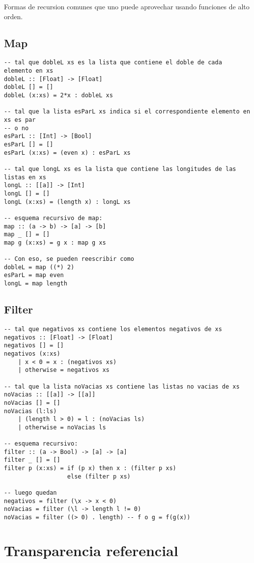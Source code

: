 \documentclass{report}
\theoremstyle{definition} %
\begin{document}
Formas de recursion comunes que uno puede aprovechar usando funciones de alto
orden.

\subsection{Map}

\begin{verbatim}
-- tal que dobleL xs es la lista que contiene el doble de cada elemento en xs
dobleL :: [Float] -> [Float]
dobleL [] = []
dobleL (x:xs) = 2*x : dobleL xs

-- tal que la lista esParL xs indica si el correspondiente elemento en xs es par
-- o no
esParL :: [Int] -> [Bool] 
esParL [] = []
esParL (x:xs) = (even x) : esParL xs

-- tal que longL xs es la lista que contiene las longitudes de las listas en xs
longL :: [[a]] -> [Int]
longL [] = []
longL (x:xs) = (length x) : longL xs

-- esquema recursivo de map:
map :: (a -> b) -> [a] -> [b]
map _ [] = []
map g (x:xs) = g x : map g xs

-- Con eso, se pueden reescribir como
dobleL = map ((*) 2)
esParL = map even
longL = map length
\end{verbatim}

\subsection{Filter}

\begin{verbatim}
-- tal que negativos xs contiene los elementos negativos de xs
negativos :: [Float] -> [Float]
negativos [] = []
negativos (x:xs)
    | x < 0 = x : (negativos xs)
    | otherwise = negativos xs

-- tal que la lista noVacias xs contiene las listas no vacias de xs
noVacias :: [[a]] -> [[a]]
noVacias [] = []
noVacias (l:ls)
    | (length l > 0) = l : (noVacias ls)
    | otherwise = noVacias ls

-- esquema recursivo:
filter :: (a -> Bool) -> [a] -> [a]
filter _ [] = []
filter p (x:xs) = if (p x) then x : (filter p xs)
                  else (filter p xs)

-- luego quedan
negativos = filter (\x -> x < 0)
noVacias = filter (\l -> length l != 0)
noVacias = filter ((> 0) . length) -- f o g = f(g(x))

\end{verbatim}

\section{Transparencia referencial}
\end{document}
